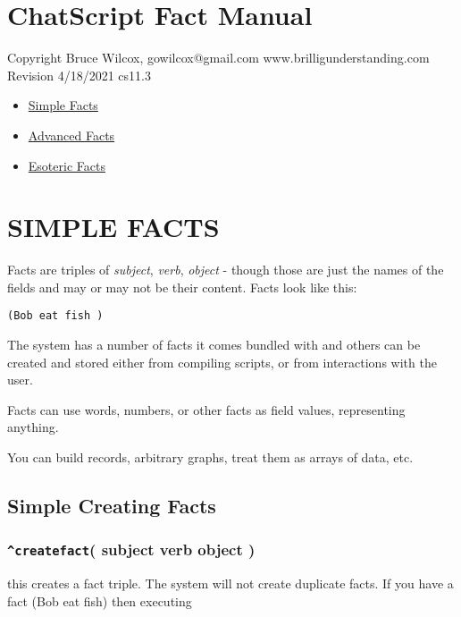\documentclass[]{article}
\date{}
\providecommand{\tightlist}{%
  \setlength{\itemsep}{0pt}\setlength{\parskip}{0pt}}
\begin{document}
\section{ChatScript Fact Manual}\label{chatscript-fact-manual}

Copyright Bruce Wilcox, gowilcox@gmail.com www.brilligunderstanding.com
Revision 4/18/2021 cs11.3

\begin{itemize}
\tightlist
\item
  \href{ChatScript-Fact-Manual.md\#simple-facts}{Simple Facts}
\item
  \href{ChatScript-Fact-Manual.md\#advanced-facts}{Advanced Facts}
\item
  \href{ChatScript-Fact-Manual.md\#esoteric-facts}{Esoteric Facts}
\end{itemize}

\section{SIMPLE FACTS}\label{simple-facts}

Facts are triples of \emph{subject}, \emph{verb}, \emph{object} - though
those are just the names of the fields and may or may not be their
content. Facts look like this:

\begin{verbatim}
(Bob eat fish )
\end{verbatim}

The system has a number of facts it comes bundled with and others can be
created and stored either from compiling scripts, or from interactions
with the user.

Facts can use words, numbers, or other facts as field values,
representing anything.

You can build records, arbitrary graphs, treat them as arrays of data,
etc.

\subsection{Simple Creating Facts}\label{simple-creating-facts}

\subsubsection{\texorpdfstring{\texttt{\^{}createfact}( subject verb
object
)}{\^{}createfact( subject verb object )}}\label{createfact-subject-verb-object}

this creates a fact triple. The system will not create duplicate facts.
If you have a fact (Bob eat fish) then executing
\end{document}
